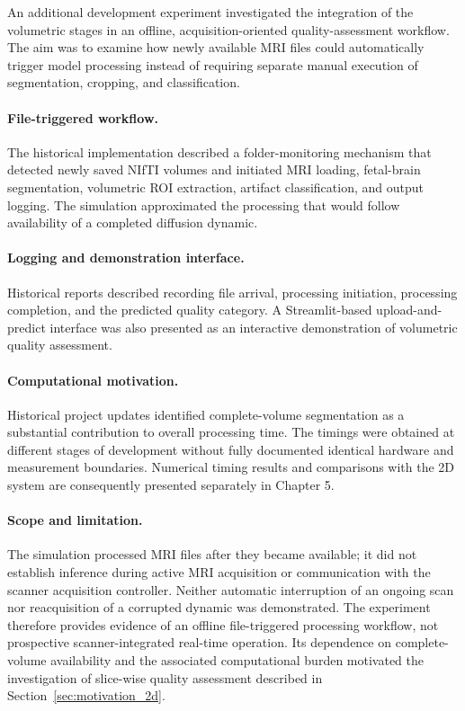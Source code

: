 An additional development experiment investigated the integration of the volumetric stages in an offline, acquisition-oriented quality-assessment workflow. The aim was to examine how newly available MRI files could automatically trigger model processing instead of requiring separate manual execution of segmentation, cropping, and classification.

\paragraph{File-triggered workflow.}
The historical implementation described a folder-monitoring mechanism that detected newly saved NIfTI volumes and initiated MRI loading, fetal-brain segmentation, volumetric ROI extraction, artifact classification, and output logging. The simulation approximated the processing that would follow availability of a completed diffusion dynamic.

\paragraph{Logging and demonstration interface.}
Historical reports described recording file arrival, processing initiation, processing completion, and the predicted quality category. A Streamlit-based upload-and-predict interface was also presented as an interactive demonstration of volumetric quality assessment.

\paragraph{Computational motivation.}
Historical project updates identified complete-volume segmentation as a substantial contribution to overall processing time. The timings were obtained at different stages of development without fully documented identical hardware and measurement boundaries. Numerical timing results and comparisons with the 2D system are consequently presented separately in Chapter 5.

\paragraph{Scope and limitation.}
The simulation processed MRI files after they became available; it did not establish inference during active MRI acquisition or communication with the scanner acquisition controller. Neither automatic interruption of an ongoing scan nor reacquisition of a corrupted dynamic was demonstrated. The experiment therefore provides evidence of an offline file-triggered processing workflow, not prospective scanner-integrated real-time operation. Its dependence on complete-volume availability and the associated computational burden motivated the investigation of slice-wise quality assessment described in Section~\ref{sec:motivation_2d}.

